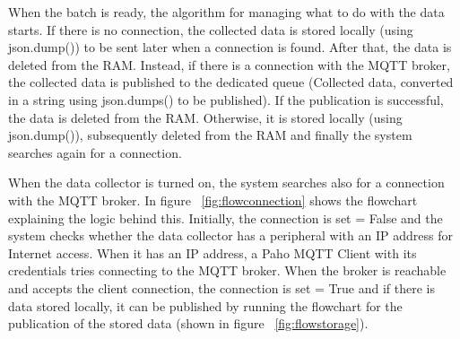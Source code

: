 When the batch is ready, the algorithm for managing what to do with the data starts. If there is no connection, the collected data is stored locally (using json.dump()) to be sent later when a connection is found. After that, the data is deleted from the RAM.
Instead, if there is a connection with the MQTT broker, the collected data is published to the dedicated queue (Collected data, converted in a string using json.dumps() to be published). If the publication is successful, the data is deleted from the RAM. Otherwise, it is stored locally (using json.dump()), subsequently deleted from the RAM and finally the system searches again for a connection.

When the data collector is turned on, the system searches also for a connection with the MQTT broker. In figure ~\ref{fig:flowconnection} shows the flowchart explaining the logic behind this. Initially, the connection is set = False and the system checks whether the data collector has a peripheral with an IP address for Internet access.
When it has an IP address, a Paho MQTT Client with its credentials tries connecting to the MQTT broker. When the broker is reachable and accepts the client connection, the connection is set = True and if there is data stored locally, it can be published by running the flowchart for the publication of the stored data (shown in figure ~\ref{fig:flowstorage}).

